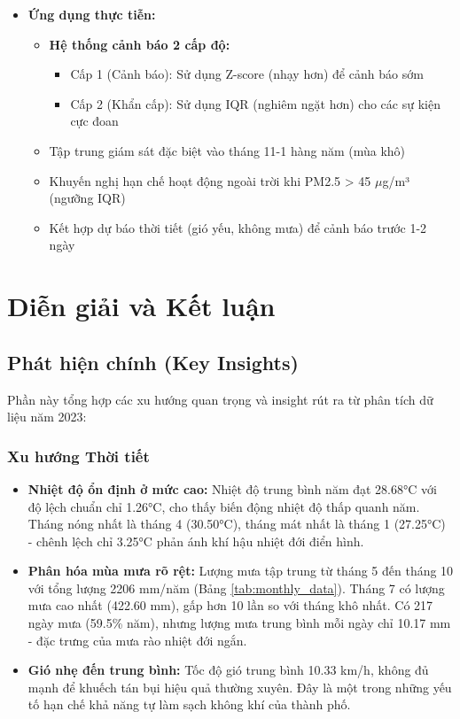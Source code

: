 \documentclass[12pt,a4paper]{article}
\begin{document}
\begin{itemize}
    \item \textbf{Ứng dụng thực tiễn:}
    \begin{itemize}
        \item \textbf{Hệ thống cảnh báo 2 cấp độ:}
        \begin{itemize}
            \item Cấp 1 (Cảnh báo): Sử dụng Z-score (nhạy hơn) để cảnh báo sớm
            \item Cấp 2 (Khẩn cấp): Sử dụng IQR (nghiêm ngặt hơn) cho các sự kiện cực đoan
        \end{itemize}
        \item Tập trung giám sát đặc biệt vào tháng 11-1 hàng năm (mùa khô)
        \item Khuyến nghị hạn chế hoạt động ngoài trời khi PM2.5 > 45 $\mu$g/m³ (ngưỡng IQR)
        \item Kết hợp dự báo thời tiết (gió yếu, không mưa) để cảnh báo trước 1-2 ngày
    \end{itemize}
\end{itemize}

\section{Diễn giải và Kết luận}

\subsection{Phát hiện chính (Key Insights)}

Phần này tổng hợp các xu hướng quan trọng và insight rút ra từ phân tích dữ liệu năm 2023:

\subsubsection{Xu hướng Thời tiết}

\begin{itemize}
    \item \textbf{Nhiệt độ ổn định ở mức cao:} Nhiệt độ trung bình năm đạt 28.68°C với độ lệch chuẩn chỉ 1.26°C, cho thấy biến động nhiệt độ thấp quanh năm. Tháng nóng nhất là tháng 4 (30.50°C), tháng mát nhất là tháng 1 (27.25°C) - chênh lệch chỉ 3.25°C phản ánh khí hậu nhiệt đới điển hình.
    
    \item \textbf{Phân hóa mùa mưa rõ rệt:} Lượng mưa tập trung từ tháng 5 đến tháng 10 với tổng lượng 2206 mm/năm (Bảng \ref{tab:monthly_data}). Tháng 7 có lượng mưa cao nhất (422.60 mm), gấp hơn 10 lần so với tháng khô nhất. Có 217 ngày mưa (59.5\% năm), nhưng lượng mưa trung bình mỗi ngày chỉ 10.17 mm - đặc trưng của mưa rào nhiệt đới ngắn.
    
    \item \textbf{Gió nhẹ đến trung bình:} Tốc độ gió trung bình 10.33 km/h, không đủ mạnh để khuếch tán bụi hiệu quả thường xuyên. Đây là một trong những yếu tố hạn chế khả năng tự làm sạch không khí của thành phố.
\end{itemize}
\end{document}
